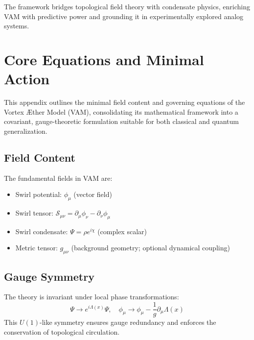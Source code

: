 \documentclass[a4paper,12pt]{article}
\begin{document}
        The framework bridges topological field theory with condensate physics, enriching VAM with predictive power and grounding it in experimentally explored analog systems.

\section{Core Equations and Minimal Action}
        This appendix outlines the minimal field content and governing equations of the Vortex Æther Model (VAM), consolidating its mathematical framework into a covariant, gauge-theoretic formulation suitable for both classical and quantum generalization.

        \subsection{Field Content}
        The fundamental fields in VAM are:
        \begin{itemize}
            \item Swirl potential: $\phi_\mu$ (vector field)
            \item Swirl tensor: $\mathcal{S}_{\mu\nu} = \partial_\mu \phi_\nu - \partial_\nu \phi_\mu$
            \item Swirl condensate: $\Psi = \rho e^{i\chi}$ (complex scalar)
            \item Metric tensor: $g_{\mu\nu}$ (background geometry; optional dynamical coupling)
        \end{itemize}

        \subsection{Gauge Symmetry}
        The theory is invariant under local phase transformations:
        \begin{equation}
            \Psi \rightarrow e^{i\Lambda(x)} \Psi, \quad \phi_\mu \rightarrow \phi_\mu - \frac{1}{g} \partial_\mu \Lambda(x)
        \end{equation}
        This $U(1)$-like symmetry ensures gauge redundancy and enforces the conservation of topological circulation.
\end{document}
